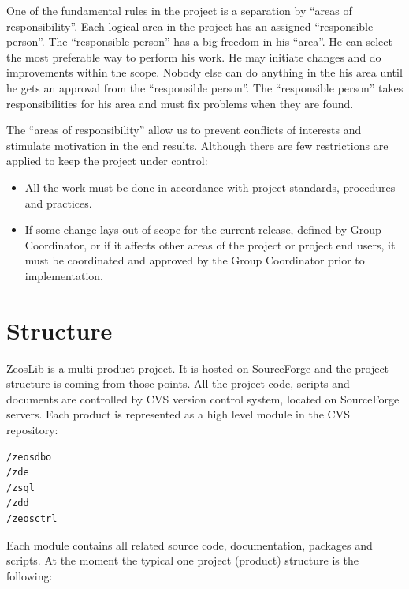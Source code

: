 \documentclass[a4paper,12pt,oneside]{book}
\begin{document}
One of the fundamental rules in the project is a separation by “areas of responsibility”.
Each logical area in the project has an assigned “responsible person”.
The “responsible person” has a big freedom in his “area”.
He can select the most preferable way to perform his work.
He may initiate changes and do improvements within the scope.
Nobody else can do anything in the his area until he gets an approval from the “responsible person”.
The “responsible person” takes responsibilities for his area and must fix problems when they are found. 

The “areas of responsibility” allow us to prevent conflicts of interests and stimulate motivation in the end results.
Although there are few restrictions are applied to keep the project under control:
\begin{itemize}
  \item All the work must be done in accordance with project standards, procedures and practices.
	\item If some change lays out of scope for the current release, defined by Group Coordinator, or if it affects other areas of the project or project end users, it must be coordinated and approved by the Group Coordinator prior to implementation.
\end{itemize}

\section{Structure}
ZeosLib is a multi-product project.
It is hosted on SourceForge and the project structure is coming from those points.
All the project code, scripts and documents are controlled by CVS version control system, located on SourceForge servers.
Each product is represented as a high level module in the CVS repository:
\begin{verbatim}
/zeosdbo
/zde
/zsql
/zdd
/zeosctrl
\end{verbatim}

Each module contains all related source code, documentation, packages and scripts.
At the moment the typical one project (product) structure is the following:
\end{document}
